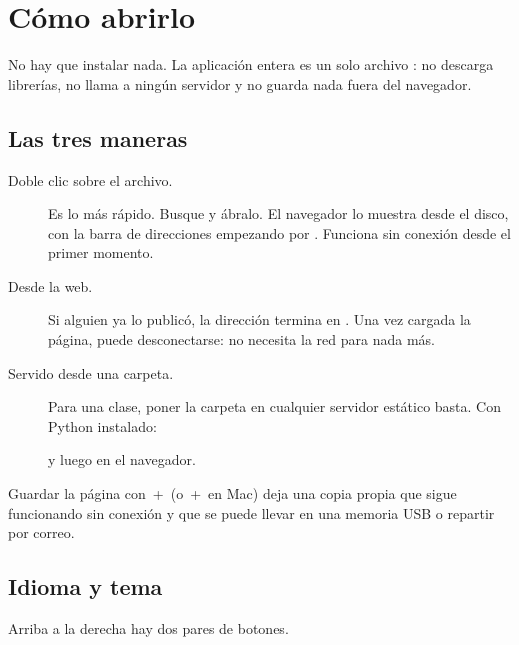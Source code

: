 
\section{Cómo abrirlo}

No hay que instalar nada. La aplicación entera es un solo archivo
: no descarga librerías, no llama a ningún servidor y no
guarda nada fuera del navegador.

\subsection{Las tres maneras}

\begin{description}
\item[Doble clic sobre el archivo.] Es lo más rápido. Busque
   y ábralo. El navegador lo muestra desde el disco,
  con la barra de direcciones empezando por . Funciona sin
  conexión desde el primer momento.
\item[Desde la web.] Si alguien ya lo publicó, la dirección termina en
  \code{/\appletfolder/}. Una vez cargada la página, puede desconectarse: no
  necesita la red para nada más.
\item[Servido desde una carpeta.] Para una clase, poner la carpeta en
  cualquier servidor estático basta. Con Python instalado:
  \begin{quote}\end{quote}
  y luego  en el navegador.
\end{description}

\begin{amnote}
Guardar la página con \,+\, (o \,+\, en
Mac) deja una copia propia que sigue funcionando sin conexión y que se puede
llevar en una memoria USB o repartir por correo.
\end{amnote}

\subsection{Idioma y tema}

Arriba a la derecha hay dos pares de botones.

